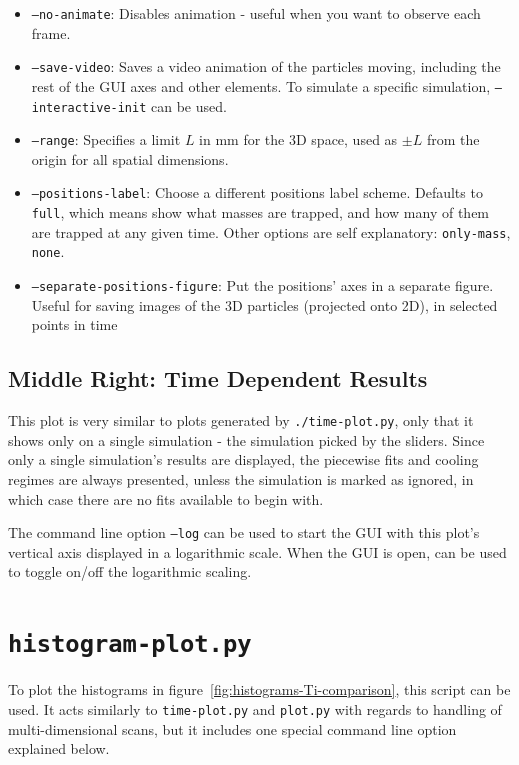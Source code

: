 \begin{itemize}
	\item \texttt{--no-animate}: Disables animation - useful when you want to observe each frame.
	\item \texttt{--save-video}: Saves a video animation of the particles moving, including the rest of the GUI axes and other elements. To simulate a specific simulation, \texttt{--interactive-init} can be used.
	\item \texttt{--range}: Specifies a limit $L$ in $\mathrm{mm}$ for the 3D space, used as $\pm L$ from the origin for all spatial dimensions.
	\item \texttt{--positions-label}: Choose a different positions label scheme. Defaults to \texttt{full}, which means show what masses are trapped, and how many of them are trapped at any given time. Other options are self explanatory: \texttt{only-mass}, \texttt{none}.
	\item \texttt{--separate-positions-figure}: Put the positions' axes in a separate figure. Useful for saving images of the 3D particles (projected onto 2D), in selected points in time
\end{itemize}

\subsection{Middle Right: Time Dependent Results}\label{ssec:manual/plot-time-dependent}

This plot is very similar to plots generated by \texttt{./time-plot.py}, only that it shows only on a single simulation - the simulation picked by the sliders. Since only a single simulation's results are displayed, the piecewise fits and cooling regimes are always presented, unless the simulation is marked as ignored, in which case there are no fits available to begin with.

The command line option \texttt{--log} can be used to start the GUI with this plot's vertical axis displayed in a logarithmic scale. When the GUI is open,  can be used to toggle on/off the logarithmic scaling.

\section{\texttt{histogram-plot.py}}

To plot the histograms in figure~\ref{fig:histograms-Ti-comparison}, this script can be used. It acts similarly to \texttt{time-plot.py} and \texttt{plot.py} with regards to handling of multi-dimensional scans, but it includes one special command line option explained below.

